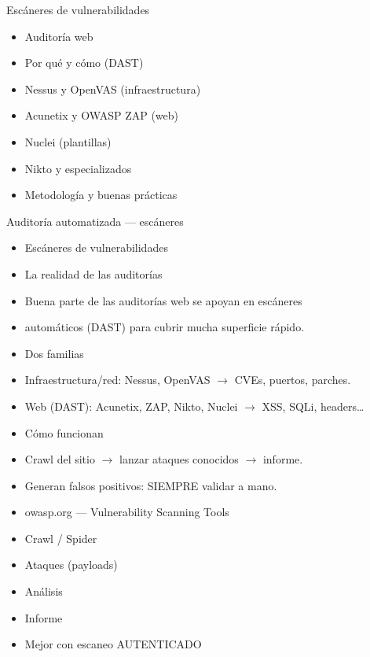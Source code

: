 \documentclass[aspectratio=169,10pt]{beamer}
\begin{document}
\begin{frame}[allowframebreaks]{Escáneres de vulnerabilidades}
\small
  \begin{itemize}
  \item Auditoría web
  \item Por qué y cómo (DAST)
  \item Nessus y OpenVAS (infraestructura)
  \item Acunetix y OWASP ZAP (web)
  \item Nuclei (plantillas)
  \item Nikto y especializados
  \item Metodología y buenas prácticas
  \end{itemize}
\end{frame}

\begin{frame}[allowframebreaks]{Auditoría automatizada --- escáneres}
\small
  \begin{itemize}
  \item Escáneres de vulnerabilidades
  \item La realidad de las auditorías
  \item Buena parte de las auditorías web se apoyan en escáneres
  \item automáticos (DAST) para cubrir mucha superficie rápido.
  \item Dos familias
  \item Infraestructura/red: Nessus, OpenVAS $\rightarrow$ CVEs, puertos, parches.
  \item Web (DAST): Acunetix, ZAP, Nikto, Nuclei $\rightarrow$ XSS, SQLi, headers\dots{}
  \item Cómo funcionan
  \item Crawl del sitio $\rightarrow$ lanzar ataques conocidos $\rightarrow$ informe.
  \item Generan falsos positivos: SIEMPRE validar a mano.
  \item owasp.org --- Vulnerability Scanning Tools
  \item Crawl / Spider
  \item Ataques (payloads)
  \item Análisis
  \item Informe
  \item Mejor con escaneo AUTENTICADO
  \end{itemize}
\end{frame}
\end{document}

